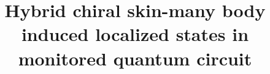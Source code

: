 \documentclass[longbibliography, aps, prx, amsmath, amssymb, amsfonts, twocolumn,superscriptaddress, footinbib]{revtex4-1}
\begin{document}
	
	
	\title{Hybrid chiral skin-many body induced localized states in monitored quantum circuit}

	
	
\end{document}
